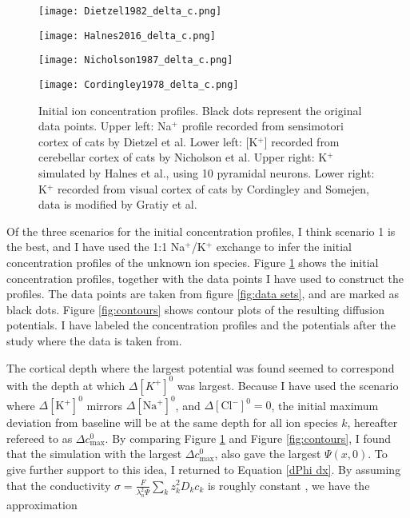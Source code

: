 \documentclass{article}
\begin{document}
\begin{figure}[!tbp]
  \centering
  \begin{minipage}[b]{0.45\textwidth}
    \texttt{[image: Dietzel1982\_delta\_c.png]}
  \end{minipage}
  \hfill
  \begin{minipage}[b]{0.45\textwidth}
    \texttt{[image: Halnes2016\_delta\_c.png]}
  \end{minipage}
    \begin{minipage}[b]{0.45\textwidth}
    \texttt{[image: Nicholson1987\_delta\_c.png]}
  \end{minipage}
  \hfill
  \begin{minipage}[b]{0.45\textwidth}
    \texttt{[image: Cordingley1978\_delta\_c.png]}
  \end{minipage}
  \caption{Initial ion concentration profiles. Black dots represent the original data points. Upper left: Na$^+$ profile recorded from sensimotori cortex of cats by Dietzel et al. Lower left: [K$^+$]  recorded from cerebellar cortex of cats by Nicholson et al. Upper right:  K$^+$ simulated by Halnes et al., using 10 pyramidal neurons. Lower right: K$^+$ recorded from visual cortex of cats by Cordingley and Somejen, data is modified by Gratiy et al.}
  \label{fig:initial concentrations}
\end{figure} 
Of the three scenarios for the initial concentration profiles, I think scenario 1 is the best, and I have used the 1:1 Na$^+$/K$^+$ exchange to infer the initial concentration profiles of the unknown ion species. Figure \ref{fig:initial concentrations} shows the initial concentration profiles, together with the data points I have used to construct the profiles. The data points are taken from figure \ref{fig:data sets}, and are marked as black dots. Figure \ref{fig:contours} shows contour plots of the resulting diffusion potentials. I have labeled the concentration profiles and the potentials after the study where the data is taken from. 

The cortical depth where the largest potential was found seemed to correspond with the depth at which $\Delta[K^+]^0$ was largest. Because I have used the scenario where $\Delta [\text{K}^+]^0$ mirrors $\Delta [\text{Na}^+]^0$, and $\Delta [\text{Cl}^-]^0 =0$, the initial maximum deviation from baseline will be at the same depth for all ion species $k$, hereafter refereed to as $\Delta c_{\text{max}}^0$. By comparing Figure \ref{fig:initial concentrations} and Figure \ref{fig:contours}, I found that the simulation with the largest  $\Delta c_{\text{max}}^0$, also gave the largest $\Psi(x,0)$. To give further support to this idea, I returned to Equation \ref{dPhi dx}. By assuming that the conductivity $\sigma = \frac{F}{\lambda_n^2 \Psi}\sum_k z_k^2D_kc_k$ is roughly constant \cite{Halnes2016}, we have the approximation
\end{document}
